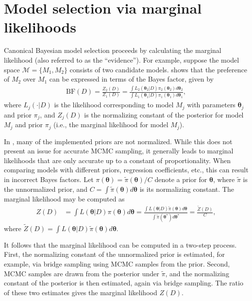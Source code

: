 \section{Model selection via marginal likelihoods}\label{sec:normconst}
Canonical Bayesian model selection proceeds by calculating the marginal likelihood (also referred to as the ``evidence''). For example, suppose the model space $\mathcal{M} = \{M_1, M_2\}$ consists of two candidate models. \cite{kass1995bayes} shows that the preference of $M_2$ over $M_1$ can be expressed in terms of the Bayes factor, given by
\begin{align}
    \text{BF}(D) = \frac{Z_2(D)}{Z_1(D)} = \frac{ \int L_2(\bm{\theta}_2 | D) \pi_2(\bm{\theta}_2) d\bm{\theta}_2 }{ \int L_1(\bm{\theta}_1 | D) \pi_1(\bm{\theta}_1) d\bm{\theta}_1 },
\end{align}
where $L_j(\cdot | D)$ is the likelihood corresponding to model $M_j$ with parameters $\bm{\theta}_j$ and prior $\pi_j$, and $Z_j(D)$ is the normalizing constant of the posterior for model $M_j$ and prior $\pi_j$ (i.e., the marginal likelihood for model $M_j$). 

In , many of the implemented priors are not normalized. While this does not present an issue for accurate MCMC sampling, it generally leads to marginal likelihoods that are only accurate up to a constant of proportionality. When comparing models with different priors, regression coefficients, etc., this can result in incorrect Bayes factors. Let $\pi(\bm{\theta}) = \tilde{\pi}(\bm{\theta}) / C$ denote a prior for $\bm{\theta}$, where $\tilde{\pi}$ is the unnormalized prior, and $C = \int \tilde{\pi}(\bm{\theta}) d\bm{\theta}$ is its normalizing constant. The marginal likelihood may be computed as
\begin{align}
    Z(D) &= \int L(\bm{\theta} | D) \pi(\bm{\theta}) d\bm{\theta}
    = \frac{ \int L(\bm{\theta} | D) \tilde{\pi}(\bm{\theta}) d\bm{\theta} }{ \int \tilde{\pi}(\bm{\theta}^*) d\bm{\theta}^* }
    = \frac{\tilde{Z}(D)}{C},
    \label{eq:normconst}
\end{align}
where $\tilde{Z}(D) = \int L(\bm{\theta} | D) \tilde{\pi}(\bm{\theta}) d\bm{\theta}$. 

It follows that the marginal likelihood can be computed in a two-step process. First, the normalizing constant of the unnormalized prior is estimated, for example, via bridge sampling using MCMC samples from the prior. Second, MCMC samples are drawn from the posterior under $\tilde{\pi}$, and the normalizing constant of the posterior is then estimated, again via bridge sampling. The ratio of these two estimates gives the marginal likelihood $Z(D)$.

